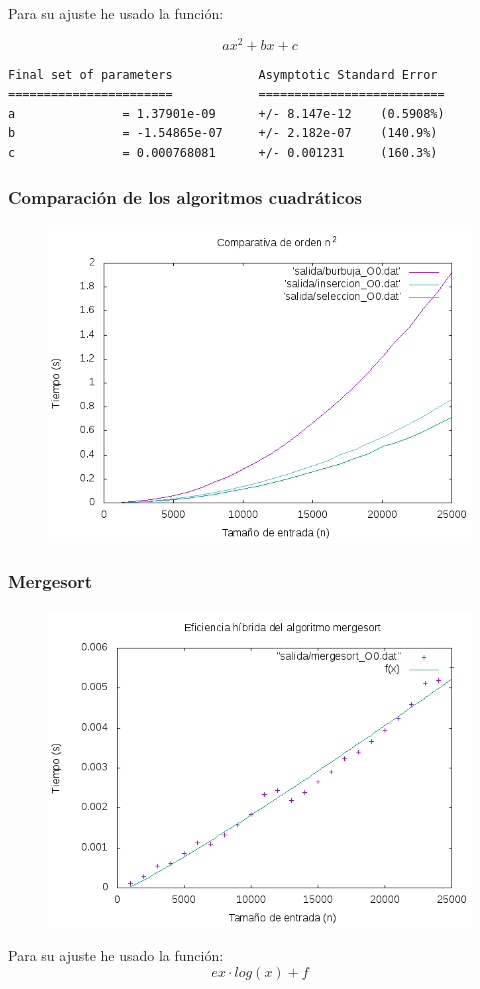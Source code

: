 \documentclass[spanish]{beamer}
\begin{document}
\begin{frame}[fragile]
  Para su ajuste he usado la función:

  $$ax^2+bx+c$$
  
\scriptsize
\begin{verbatim}
Final set of parameters            Asymptotic Standard Error
=======================            ==========================
a               = 1.37901e-09      +/- 8.147e-12    (0.5908%)
b               = -1.54865e-07     +/- 2.182e-07    (140.9%)
c               = 0.000768081      +/- 0.001231     (160.3%)
\end{verbatim}
  
\end{frame}

%
%

\begin{frame}\frametitle{Comparación de los algoritmos cuadráticos}
  \begin{figure}[H]
    \centering   
        \includegraphics[clip,width=0.8\columnwidth]{../plots/cuadraticos_O0.png}%
    \end{figure}
  \end{frame}

 \begin{frame}\frametitle{Mergesort}
    \begin{figure}[H]
    \centering   
    \includegraphics[clip,width=0.76\columnwidth]{../plots/mergesort_O0_fit.png}%
    \end{figure}

    Para su ajuste he usado la función: $$ex\cdot log(x)+f$$
       
  \end{frame}
\end{document}
